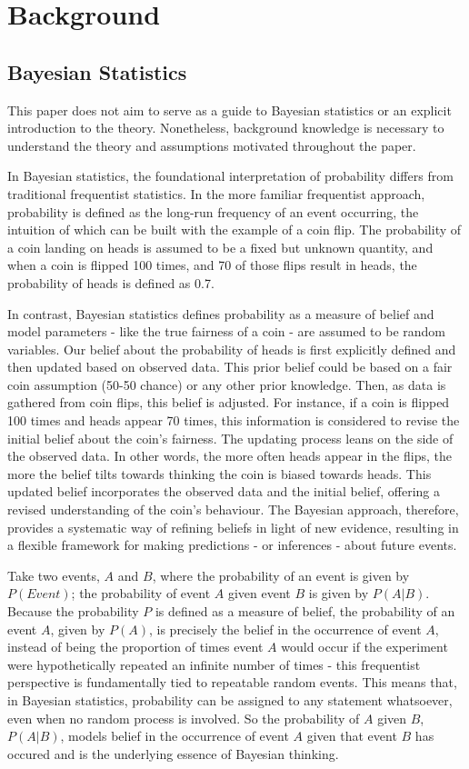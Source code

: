 \section{Background}
\subsection{Bayesian Statistics}
This paper does not aim to serve as a guide to Bayesian statistics or an
explicit introduction to the theory. Nonetheless, background knowledge is
necessary to understand the theory and assumptions motivated throughout the
paper.

In Bayesian statistics, the foundational interpretation of probability differs
from traditional frequentist statistics. In the more familiar frequentist approach,
probability is defined as the long-run frequency of an event occurring, the
intuition of which can be built with the example of a coin flip. The
probability of a coin landing on heads is assumed to be a fixed but unknown
quantity, and when a coin is flipped 100 times, and 70 of those flips result in
heads, the probability of heads is defined as 0.7.

In contrast, Bayesian statistics defines probability as a measure of belief and
model parameters - like the true fairness of a coin - are assumed to be random
variables. Our belief about the probability of heads is first explicitly
defined and then updated based on observed data. 
This prior belief could be based on a fair coin assumption (50-50 chance) or any other
prior knowledge. Then, as data is gathered from coin flips, this belief is
adjusted.
For instance, if a coin is flipped 100 times and heads appear 70 times, this
information is considered to revise the initial belief about the coin's
fairness. The updating process leans on the side of the observed data. In other
words, the more often heads appear in the flips, the more the belief tilts
towards thinking the coin is biased towards heads.
This updated belief incorporates the observed data and the initial belief,
offering a revised understanding of the coin's behaviour. The Bayesian approach,
therefore, provides a systematic way of refining beliefs in light of new
evidence, resulting in a flexible framework for making predictions - or
inferences - about future events.

Take two events, $A$ and $B$, where the probability of an event is given by
$P(Event)$; the probability of event $A$ given event $B$ is given by $P(A|B)$.
Because the probability $P$ is defined as a measure of belief, the probability
of an event $A$, given by $P(A)$, is precisely the belief in the occurrence of
event $A$, instead of being the proportion of times event $A$ would occur if
the experiment were hypothetically repeated an infinite number of times - this
frequentist perspective is fundamentally tied to repeatable random events. This
means that, in Bayesian statistics, probability can be assigned to any
statement whatsoever, even when no random process is involved. So the
probability of $A$ given $B$, $P(A|B)$, models belief in the occurrence of event
$A$ given that event $B$ has occured and is the underlying essence of Bayesian
thinking.
